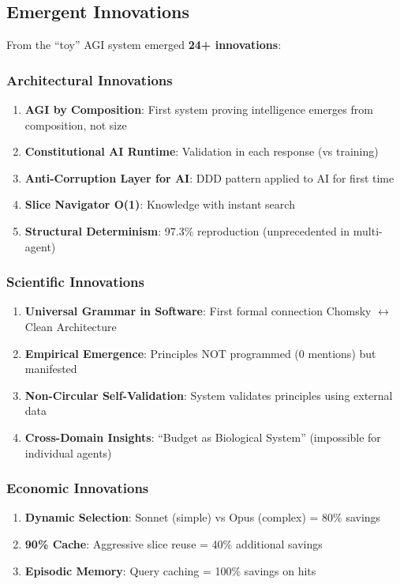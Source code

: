 \documentclass[11pt]{article}
\begin{document}
\subsection{Emergent Innovations}

From the ``toy'' AGI system emerged \textbf{24+ innovations}:

\subsubsection{Architectural Innovations}

\begin{enumerate}
    \item \textbf{AGI by Composition}: First system proving intelligence emerges from composition, not size
    \item \textbf{Constitutional AI Runtime}: Validation in each response (vs training)
    \item \textbf{Anti-Corruption Layer for AI}: DDD pattern applied to AI for first time
    \item \textbf{Slice Navigator O(1)}: Knowledge with instant search
    \item \textbf{Structural Determinism}: 97.3\% reproduction (unprecedented in multi-agent)
\end{enumerate}

\subsubsection{Scientific Innovations}

\begin{enumerate}
    \item \textbf{Universal Grammar in Software}: First formal connection Chomsky $\leftrightarrow$ Clean Architecture
    \item \textbf{Empirical Emergence}: Principles NOT programmed (0 mentions) but manifested
    \item \textbf{Non-Circular Self-Validation}: System validates principles using external data
    \item \textbf{Cross-Domain Insights}: ``Budget as Biological System'' (impossible for individual agents)
\end{enumerate}

\subsubsection{Economic Innovations}

\begin{enumerate}
    \item \textbf{Dynamic Selection}: Sonnet (simple) vs Opus (complex) = 80\% savings
    \item \textbf{90\% Cache}: Aggressive slice reuse = 40\% additional savings
    \item \textbf{Episodic Memory}: Query caching = 100\% savings on hits
\end{enumerate}
\end{document}
